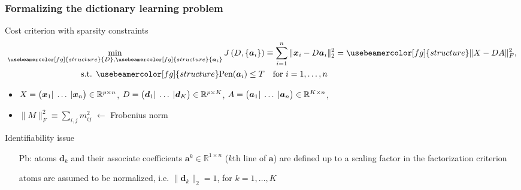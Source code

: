 \documentclass[compress, smaller, serif, 9pt]{beamer}
\newcommand{\structuretext}[1]{{\usebeamercolor[fg]{structure} #1}}
\newcommand{\doigtr}{\alert{\noindent \Pisymbol{pzd}{43}}}
\newcommand{\bx}{{\boldsymbol{x}}}
\newcommand{\bX}{{X}}
\newcommand{\bd}{{\boldsymbol{d}}}
\newcommand{\bD}{{D}}
\newcommand{\ba}{{\boldsymbol{a}}}
\newcommand{\bAl}{A}
\begin{document}
\begin{frame}
  \frametitle{Formalizing the dictionary learning problem}
  
  \begin{block}{Cost criterion with sparsity constraints}
  \vspace{-4mm}
  \begin{align*}
     \min_{\structuretext{\bD},\structuretext{\{\ba_i\}}} J\left(\bD,\{\ba_i\}\right) & 
     \equiv \sum_{i=1}^n \| \bx_i - \bD \ba_i \|_2^2  = \structuretext{ \| \bX-\bD \bAl\|^2_F},\\
     \textrm{s.t. }  \structuretext{ \textrm{Pen}(\ba_i) \le T }&  \quad \textrm{for } i=1,\ldots,n
  \end{align*}
  \vspace{-4mm}
  \begin{itemize}
  \item $\bX = \begin{pmatrix}\bx_1|&\hspace{-2mm }  \ldots \hspace{-2mm } &| \bx_n\\  \end{pmatrix} \in \mathbb{R}^{p\times n}$, 
  \quad $\bD = \begin{pmatrix}\bd_1|&\hspace{-2mm }  \ldots \hspace{-2mm } &| \bd_K\\  \end{pmatrix} \in \mathbb{R}^{p\times K}$, \quad 
   $\bAl = \begin{pmatrix}\ba_1|&\hspace{-2mm }  \ldots \hspace{-2mm } &| \ba_n\\  \end{pmatrix} \in \mathbb{R}^{K \times n}$,\\
   \item $\|M\|_F^2 \equiv \sum_{i,j} m_{ij}^2$ $\leftarrow$ Frobenius norm   
  \end{itemize}
\end{block}


  \begin{block}{Identifiability issue}
  \begin{itemize}
     \item[Pb:] atoms $\bd_k$ and their associate coefficients $\ba^k \in \mathbb{R}^{1\times n}$ ($k$th line of $\ba$) are defined up to a scaling factor in the factorization criterion
     \item[\doigtr] atoms are assumed to be \alert{normalized}, i.e. \alert{$\|\bd_k\|_2 =1$}, for $k=1,\ldots,K$      
  \end{itemize}
  \end{block}
    
\end{frame}
\end{document}
